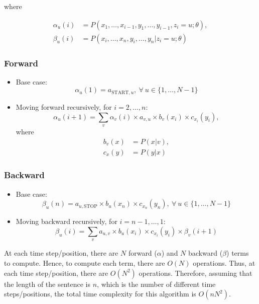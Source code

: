 \documentclass[11pt,fancychapters]{article}
\begin{document}
where

\begin{align*}
	\alpha_u(i) &= P(x_1, \ldots, x_{i-1}, y_1, \ldots, y_{i-1}, z_i = u; \theta), \\
	\beta_u(i) &= P(x_i, \ldots, x_n, y_i, \ldots, y_n | z_i = u; \theta)
\end{align*}

\subsubsection*{Forward}

\begin{itemize}
	\item Base case:
	\begin{equation*}
		\alpha_u(1) = a_{\text{START}, u}, ~ \forall ~ u \in \{ 1, \ldots, N - 1 \}
	\end{equation*}

	\item Moving forward recursively, for $i = 2, \ldots, n$:
	\begin{equation*}
		\alpha_u(i + 1) = \sum_v \alpha_v(i) \times a_{v, u} \times b_v(x_i) \times c_{x_i}(y_i),
	\end{equation*}
	where
	\begin{align*}
		b_v(x) &= P(x | v), \\
		c_x(y) &= P(y | x)
	\end{align*}
\end{itemize}

\subsubsection*{Backward}

\begin{itemize}
	\item Base case:
	\begin{equation*}
		\beta_u(n) = a_{u, \text{STOP}} \times b_u(x_n) \times c_{x_n}(y_n), ~ \forall ~ u \in \{ 1, \ldots, N - 1 \}
	\end{equation*}
	
	\item Moving backward recursively, for $i = n - 1, \ldots, 1$:
	\begin{equation*}
		\beta_u(i) = \sum_v a_{u, v} \times b_u(x_i) \times c_{x_i}(y_i) \times \beta_v(i + 1)
	\end{equation*}
\end{itemize}

At each time step/position, there are $N$ forward ($\alpha$) and $N$ backward ($\beta$) terms to compute. Hence, to compute each term, there are $O(N)$ operations. Thus, at each time step/position, there are $O(N^2)$ operations. Therefore, assuming that the length of the sentence is $n$, which is the number of different time steps/positions, the total time complexity for this algorithm is $O(nN^2)$.
\end{document}
